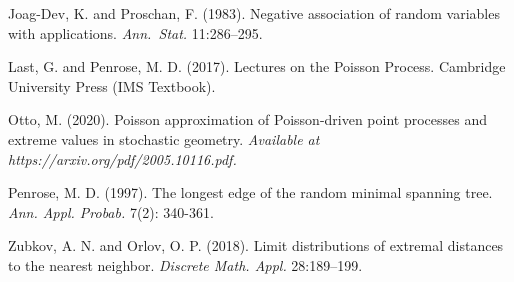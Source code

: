 \documentclass{article}
\theoremstyle{thm}
\theoremstyle{definition}
\theoremstyle{definition}
\theoremstyle{def}
\begin{document}
\begin{thebibliography}{1}
Joag-Dev, K. and Proschan, F. (1983). Negative association of random variables with applications. \textit{Ann.\ Stat.} 11:286--295.

Last, G. and Penrose, {M. D.} (2017).
Lectures on the {P}oisson {P}rocess. Cambridge University Press ({I}MS {T}extbook).

{
Otto, M. (2020). Poisson approximation of Poisson-driven point processes and
extreme values in stochastic geometry. \textit{Available at https://arxiv.org/pdf/2005.10116.pdf.}}


{
Penrose, M. D. (1997). The longest edge of the random minimal spanning tree. \textit{Ann. Appl. Probab.} 7(2):  340-361.}


Zubkov, A. N. and Orlov, O. P. (2018).
Limit distributions of extremal distances to the nearest neighbor.
\textit{Discrete Math. Appl.} 28:189--199.

\end{thebibliography}
\end{document}
